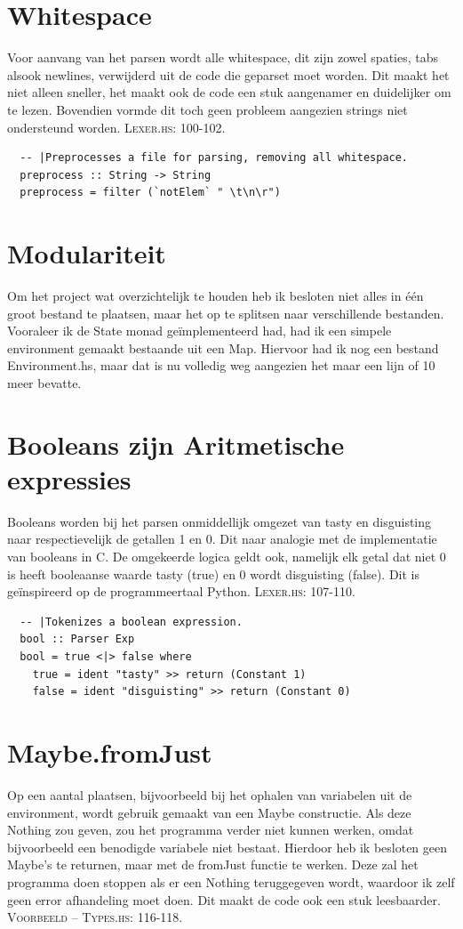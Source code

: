 \documentclass[12pt,a4paper]{report}
\begin{document}
\section{Whitespace}
Voor aanvang van het parsen wordt alle whitespace, dit zijn zowel spaties, tabs alsook newlines, verwijderd uit de code die geparset moet worden. Dit maakt het niet alleen sneller, het maakt ook de code een stuk aangenamer en duidelijker om te lezen. Bovendien vormde dit toch geen probleem aangezien strings niet ondersteund worden. \textsc{Lexer.hs: 100-102.}
\begin{lstlisting}
  -- |Preprocesses a file for parsing, removing all whitespace.
  preprocess :: String -> String
  preprocess = filter (`notElem` " \t\n\r")
\end{lstlisting}
\section{Modulariteit}
Om het project wat overzichtelijk te houden heb ik besloten niet alles in één groot bestand te plaatsen, maar het op te splitsen naar verschillende bestanden. Vooraleer ik de State monad geïmplementeerd had, had ik een simpele environment gemaakt bestaande uit een Map. Hiervoor had ik nog een bestand Environment.hs, maar dat is nu volledig weg aangezien het maar een lijn of 10 meer bevatte.
\section{Booleans zijn Aritmetische expressies}
Booleans worden bij het parsen onmiddellijk omgezet van tasty en disguisting naar respectievelijk de getallen 1 en 0. Dit naar analogie met de implementatie van booleans in C. De omgekeerde logica geldt ook, namelijk elk getal dat niet 0 is heeft booleaanse waarde tasty (true) en 0 wordt disguisting (false). Dit is geïnspireerd op de programmeertaal Python. \textsc{Lexer.hs: 107-110.}
\begin{lstlisting}
  -- |Tokenizes a boolean expression.
  bool :: Parser Exp
  bool = true <|> false where
    true = ident "tasty" >> return (Constant 1)
    false = ident "disguisting" >> return (Constant 0)
\end{lstlisting}
\section{Maybe.fromJust}
Op een aantal plaatsen, bijvoorbeeld bij het ophalen van variabelen uit de environment, wordt gebruik gemaakt van een Maybe constructie. Als deze Nothing zou geven, zou het programma verder niet kunnen werken, omdat bijvoorbeeld een benodigde variabele niet bestaat. Hierdoor heb ik besloten geen Maybe’s te returnen, maar met de fromJust functie te werken. Deze zal het programma doen stoppen als er een Nothing teruggegeven wordt, waardoor ik zelf geen error afhandeling moet doen. Dit maakt de code ook een stuk leesbaarder. \textsc{Voorbeeld – Types.hs: 116-118.}
\end{document}
